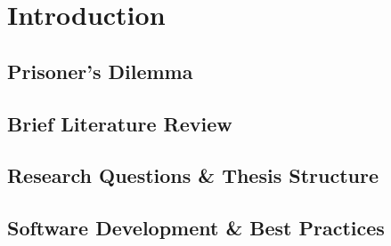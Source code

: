\chapter{Introduction}

\section{Prisoner's Dilemma}

\section{Brief Literature Review}

\section{Research Questions \& Thesis Structure}

\section{Software Development \& Best Practices}
